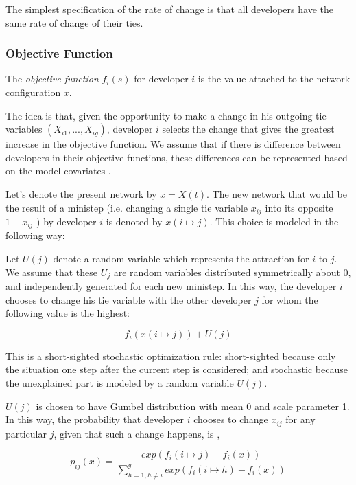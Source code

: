 \documentclass[11pt]{report}
\begin{document}
The simplest specification of the rate of change is that all developers have the same rate of change of their ties. 

\subsubsection{Objective Function}

The \textit{objective function} $f_i(s)$ for developer $i$ is the value attached to the network configuration $x$. 

The idea is that, given the opportunity to make a change in his outgoing tie variables $(X_{i1},...,X_{ig})$, developer $i$ selects the change that gives the greatest increase in the objective function. We assume that if there is difference between developers in their objective functions, these differences can be represented based on the model covariates \cite{Snijders2004}. 

Let's denote the present network by $x = X(t)$. The new network that would be the result of a ministep (i.e. changing a single tie variable $x_{ij}$ into its opposite $1 - x_{ij}$ ) by developer $i$ is denoted by $x(i \mapsto j)$. This choice is modeled in the following way: 

Let $U(j)$ denote a random variable which represents the attraction for $i$ to $j$. We assume that these $U_j$ are random variables distributed symmetrically about 0, and independently generated for each new ministep. In this way, the developer $i$ chooses to change his tie variable with the other developer $j$ for whom the following value \cite{Snijders2004} is the highest:

\begin{equation}
f_i(x(i \mapsto j)) + U(j)
\end{equation} 

This is a short-sighted stochastic optimization rule: short-sighted because only the situation one step after the current step is considered; and stochastic because the unexplained part is modeled by a random variable $U(j)$. 

$U(j)$ is chosen to have Gumbel distribution with mean 0 and scale parameter 1. In this way, the probability that developer $i$ chooses to change $x_{ij}$ for any particular $j$, given that such a change happens, is \cite{Snijders2004},

\begin{equation}
p_{ij}(x) = \frac{exp(f_i(i \mapsto j) - f_i(x))}{\sum_{h=1, h \neq i}^{g} exp(f_i(i \mapsto h) - f_i(x))}
\end{equation}
\end{document}
